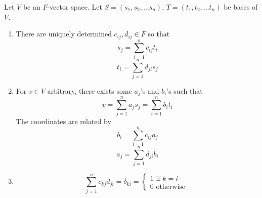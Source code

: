\begin{proposition}
    Let $V$ be an $F$-vector space. Let $S = (s_1, s_2, \hdots s_n)$, $T = (t_1, t_2, \hdots t_n)$ be bases of $V$. \\

    \begin{enumerate}
        \item There are uniquely determined $c_{ij}, d_{ij} \in F$  so that 
        \[
            s_j = \sum\limits_{i = 1}^{n} c_{ij} t_i
        \]
        \[
            t_i = \sum\limits_{j = 1}^{n} d_{ji} s_j
        \]
        \item For $v \in V$ arbitrary,  there exists some $a_j$'s and $b_i$'s such that 
        \[
            v = \sum\limits_{j = 1}^{n} a_j s_j = \sum\limits_{i = 1}^{n} b_i t_i
        \]
        The coordinates are related by 
        \[
            b_i = \sum\limits_{i = 1}^{n} c_{ij} a_j
        \]
        \[
            a_j = \sum\limits_{j = 1}^{n} d_{ji} b_i
        \]
        \item \[
            \sum\limits_{j = 1}^{n} c_{kj}d_{ji} = \delta_{ki} = \begin{cases}
                1 \text{ if } k = i \\
                0 \text{ otherwise }
            \end{cases}
        \]
    \end{enumerate}
\end{proposition}

